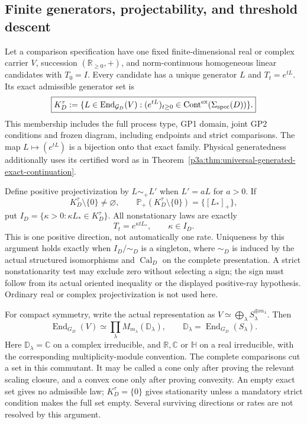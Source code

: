 \documentclass[12pt,a4paper]{article}
\begin{document}
\subsection{Finite generators, projectability, and threshold descent}
\begin{theorem}
\label{p3a:thm:finite-generator-one-ray-rigidity}
Let a comparison specification have one fixed finite-dimensional real or
complex carrier \(V\), succession \((\mathbb R_{\ge0},+)\), and
norm-continuous homogeneous linear candidates with \(T_0=I\). Every
candidate has a unique generator \(L\) and \(T_t=e^{tL}\). Its exact
admissible generator set is
\[
 \boxed{K_D^\tau:=\{L\in\operatorname{End}_{\mathcal G_D}(V):
   (e^{tL})_{t\ge0}\in
   \operatorname{Cont}^{\rm ex}(\Sigma_{\rm spec}(D))\}.}
\]
This membership includes the full process type, GP1 domain, joint GP2
conditions and frozen diagram, including endpoints and strict comparisons.
The map \(L\mapsto(e^{tL})\) is a bijection onto that exact family.
Physical generatedness additionally uses its certified word as in
Theorem~\ref{p3a:thm:universal-generated-exact-continuation}.

Define positive projectivization by \(L\sim_+L'\) when \(L'=aL\)
for \(a>0\). If
\[
 K_D^\tau\setminus\{0\}\ne\varnothing,\qquad
 \mathbb P_+(K_D^\tau\setminus\{0\})=\{[L_*]_+\},
\]
put \(I_D=\{\kappa>0:\kappa L_*\in K_D^\tau\}\). All nonstationary
laws are exactly
\[
 \boxed{T_t=e^{\kappa tL_*},\qquad\kappa\in I_D.}
\]
This is one positive direction, not automatically one rate. Uniqueness by
this argument holds exactly when \(I_D/\!\sim_D\) is a singleton, where
\(\sim_D\) is induced by the actual structured isomorphisms and
\(\operatorname{Cal}_D\) on the complete presentation. A strict
nonstationarity test may exclude zero without selecting a sign; the sign
must follow from its actual oriented inequality or the displayed positive-ray
hypothesis. Ordinary real or complex projectivization is not used here.

For compact symmetry, write the actual representation as
\(V\simeq\bigoplus_\lambda S_\lambda^{\oplus m_\lambda}\). Then
\[
 \operatorname{End}_{G_D}(V)\simeq
 \prod_\lambda M_{m_\lambda}(\mathbb D_\lambda),\qquad
 \mathbb D_\lambda=\operatorname{End}_{G_D}(S_\lambda).
\]
Here \(\mathbb D_\lambda=\mathbb C\) on a complex irreducible, and
\(\mathbb R,\mathbb C\) or \(\mathbb H\) on a real irreducible, with
the corresponding multiplicity-module convention. The complete comparisons
cut a set in this commutant. It may be called a cone only after proving the
relevant scaling closure, and a convex cone only after proving convexity.
An empty exact set gives no admissible law; \(K_D^\tau=\{0\}\) gives
stationarity unless a mandatory strict condition makes the full set empty.
Several surviving directions or rates are not resolved by this argument.
\end{theorem}
\end{document}
